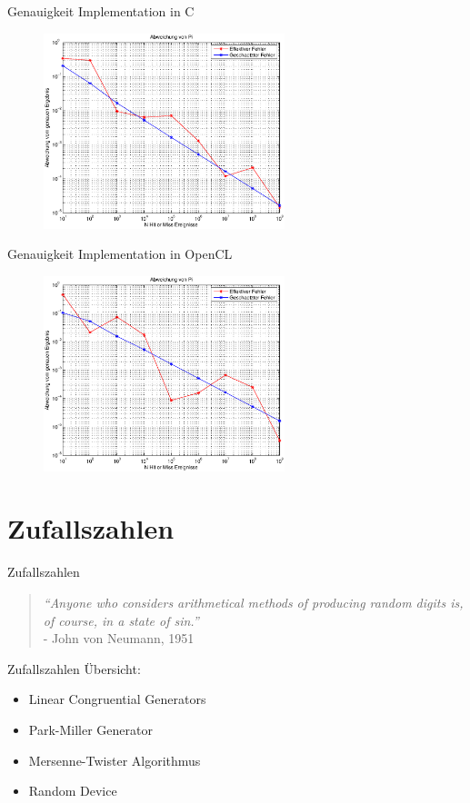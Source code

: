 \documentclass{beamer}
\begin{document}
\begin{frame}{Genauigkeit}
	Implementation in C
	\begin{figure}
		\centering
		\includegraphics[width=7cm]{images/Abweichung_C.eps}
	\end{figure}
\end{frame}
\begin{frame}{Genauigkeit}
	Implementation in OpenCL
	\begin{figure}
		\centering
		\includegraphics[width=7cm]{images/Abweichung_OpenCl.eps}
	\end{figure}
\end{frame}

\section{Zufallszahlen}
\begin{frame}{Zufallszahlen}
	\begin{quote}
	\textit{“Anyone who considers arithmetical methods of producing random digits is, of course, in a state of sin.”} \\ - John von Neumann, 1951
	\end{quote}
\end{frame}

\begin{frame}{Zufallszahlen}
	Übersicht:
	\begin{itemize}
		\item<1-> Linear Congruential Generators
		\item<1-> Park-Miller Generator
		\item<1-> Mersenne-Twister Algorithmus
		\item<1-> Random Device
	\end{itemize}
\end{frame}
\end{document}
